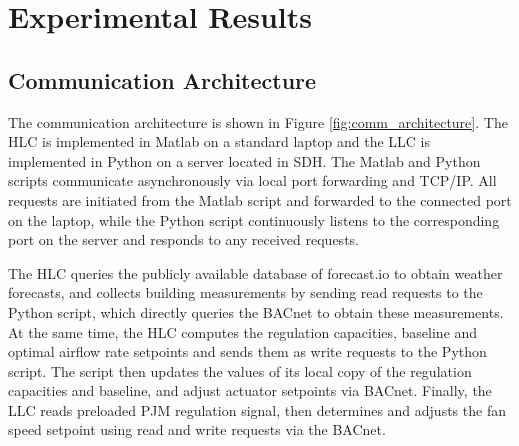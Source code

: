 %
%


\section{Experimental Results}\label{sec:results}



\subsection{Communication Architecture}\label{sec:comm}

The communication architecture is shown in Figure \ref{fig:comm_architecture}.
The HLC is implemented in Matlab on a standard laptop and the LLC is implemented in Python on a server located in SDH.
The Matlab and Python scripts communicate asynchronously via local port forwarding and TCP/IP.
All requests are initiated from the Matlab script and forwarded to the connected port on the laptop, while the Python script continuously listens to the corresponding port on the server and responds to any received requests.

The HLC queries the publicly available database of forecast.io to obtain weather forecasts, and collects building measurements by sending read requests to the Python script, which directly queries the BACnet to obtain these measurements. 
At the same time, the HLC computes the regulation capacities, baseline and optimal airflow rate setpoints and sends them as write requests to the Python script. The script then updates the values of its local copy of the regulation capacities and baseline, and adjust actuator setpoints via BACnet.
Finally, the LLC reads preloaded PJM regulation signal, then determines and adjusts the fan speed setpoint using read and write requests via the BACnet.  

